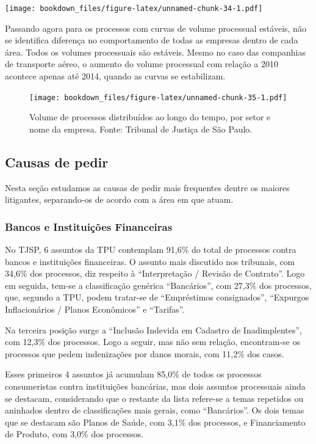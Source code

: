 \documentclass[]{report}
\begin{document}
\texttt{[image: bookdown\_files/figure-latex/unnamed-chunk-34-1.pdf]}

Passando agora para os processos com curvas de volume processual
estáveis, não se identifica diferença no comportamento de todas as
empresas dentro de cada área. Todos os volumes processuais são estáveis.
Mesmo no caso das companhias de transporte aéreo, o aumento do volume
processual com relação a 2010 acontece apenas até 2014, quando as curvas
se estabilizam.

\begin{figure}[htbp]
\centering
\texttt{[image: bookdown\_files/figure-latex/unnamed-chunk-35-1.pdf]}
\caption{\label{fig:unnamed-chunk-35}Volume de processos distribuídos ao
longo do tempo, por setor e nome da empresa. Fonte: Tribunal de Justiça
de São Paulo.}
\end{figure}

\subsection{Causas de pedir}\label{causas-de-pedir-2}

Nesta seção estudamos as causas de pedir mais frequentes dentre os
maiores litigantes, separando-os de acordo com a área em que atuam.

\subsubsection{Bancos e Instituições
Financeiras}\label{bancos-e-instituicoes-financeiras-2}

No TJSP, 6 assuntos da TPU contemplam 91,6\% do total de processos
contra bancos e instituições financeiras. O assunto mais discutido nos
tribunais, com 34,6\% dos processos, diz respeito à ``Interpretação /
Revisão de Contrato''. Logo em seguida, tem-se a classificação genérica
``Bancários'', com 27,3\% dos processos, que, segundo a TPU, podem
tratar-se de ``Empréstimos consignados'', ``Expurgos Inflacionários /
Planos Econômicos'' e ``Tarifas''.

Na terceira posição surge a ``Inclusão Indevida em Cadastro de
Inadimplentes'', com 12,3\% dos processos. Logo a seguir, mas não sem
relação, encontram-se os processos que pedem indenizações por danos
morais, com 11,2\% dos casos.

Esses primeiros 4 assuntos já acumulam 85,0\% de todos os processos
consumeristas contra instituições bancárias, mas dois assuntos
processuais ainda se destacam, considerando que o restante da lista
refere-se a temas repetidos ou aninhados dentro de classificações mais
gerais, como ``Bancários''. Os dois temas que se destacam são Planos de
Saúde, com 3,1\% dos processos, e Financiamento de Produto, com 3,0\%
dos processos.
\end{document}
